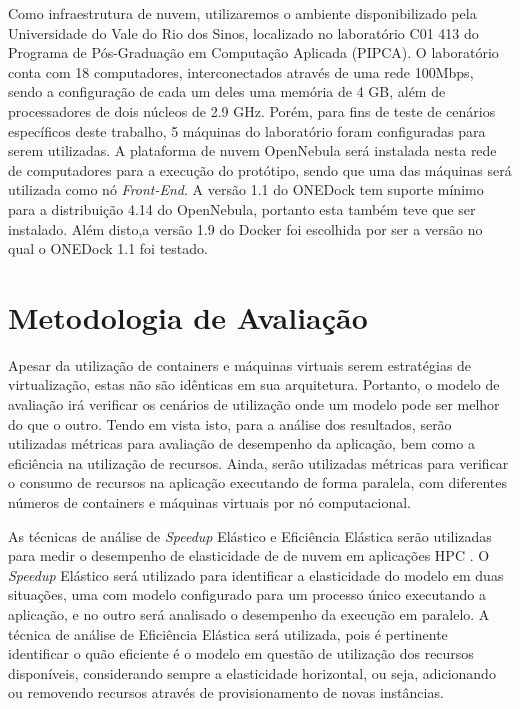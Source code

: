 \documentclass[twoside,english,brazilian]{UNISINOSartigo}
\begin{document}
Como infraestrutura de nuvem, utilizaremos o ambiente disponibilizado pela Universidade do Vale do Rio dos Sinos, localizado no laboratório C01 413 do Programa de Pós-Graduação em Computação Aplicada (PIPCA). O laboratório conta com 18 computadores, interconectados através de uma rede 100Mbps, sendo a configuração de cada um deles uma memória de 4 GB, além de processadores de dois núcleos de 2.9 GHz. Porém, para fins de teste de cenários específicos deste trabalho, 5 máquinas do laboratório foram configuradas para serem utilizadas. A plataforma de nuvem OpenNebula será instalada nesta rede de computadores para a execução do protótipo, sendo que uma das máquinas será utilizada como nó \textit{Front-End}. 
A versão 1.1 do ONEDock tem suporte mínimo para a distribuição 4.14 do OpenNebula, portanto esta também teve que ser instalado. Além disto,a versão 1.9 do Docker foi escolhida por ser a versão no qual o ONEDock 1.1 foi testado. 


\section{Metodologia de Avaliação}
\label{avaliacao}

Apesar da utilização de containers e máquinas virtuais serem estratégias de virtualização, estas não são idênticas em sua arquitetura. Portanto, o modelo de avaliação irá verificar os cenários de utilização onde um modelo pode ser melhor do que o outro. Tendo em vista isto, para a análise dos resultados, serão utilizadas métricas para avaliação de desempenho da aplicação, bem como a eficiência na utilização de recursos. Ainda, serão utilizadas métricas para verificar o consumo de recursos na aplicação executando de forma paralela, com diferentes números de containers e máquinas virtuais por nó computacional. 

As técnicas de análise de \textit{Speedup} Elástico e Eficiência Elástica serão utilizadas para medir o desempenho de elasticidade de de nuvem em aplicações HPC \cite{Facco2016}. O \textit{Speedup} Elástico será utilizado para identificar a elasticidade do modelo em duas situações, uma com modelo configurado para um processo único executando a aplicação, e no outro será analisado o desempenho da execução em paralelo. A técnica de análise de Eficiência Elástica será utilizada, pois é pertinente identificar o quão eficiente é o modelo em questão de utilização dos recursos disponíveis, considerando sempre a elasticidade horizontal, ou seja, adicionando ou removendo recursos através de provisionamento de novas instâncias. 
\end{document}

